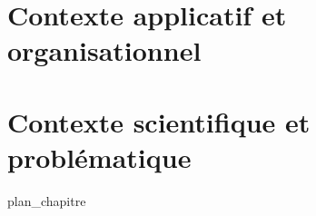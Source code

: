 %
\chapter{Contexte applicatif et organisationnel}
\label{chap:1}
%
\chapter{Contexte scientifique et problématique}
\label{chap:2}
{plan_chapitre}
%
%
